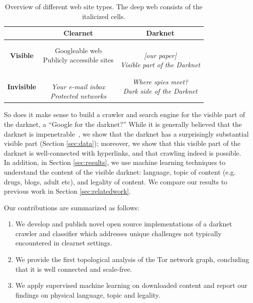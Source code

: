 
\begin{table}[h!]
  \begin{center}
    \caption{Overview of different web site types. The deep web consists of the italicized cells.}
    \label{tab:overview}
    \begin{tabular}{c|c | c }
      & \textbf{Clearnet} & \textbf{Darknet}\\
      \hline
      \hline
      \textbf{Visible}&
      \shortstack[c]{Googleable web \\ Publicly accessible sites} & 
      \shortstack[c]{\\[1pt] \textit{[our paper]} \\ \textit{Visible part of the Darknet}}\\
      \hline
      \textbf{Invisible}&
      \shortstack[c]{\\[1pt] \textit{Your e-mail inbox} \\ \textit{Protected networks}} & 
      \shortstack[c]{\textit{Where spies meet?} \\ \textit{Dark side of the Darknet}}\\
    \end{tabular}
  \end{center}
\end{table}

% 
So does it make sense to build a crawler and search engine for the visible part of the darknet, a ``Google for the darknet?'' While it is generally believed that the darknet is impenetrable~\cite{Biryukov2014,Nabki2017}, we show that the darknet has a surprisingly substantial visible part (Section \ref{sec:data}); moreover, we show that this visible part of the darknet is well-connected with hyperlinks, and that crawling indeed is possible. In addition, in Section \ref{sec:results}, we use machine learning techniques to understand the content of the visible darknet: language, topic of content (e.g. drugs, blogs, adult etc), and legality of content.  
We compare our results to previous work in Section \ref{sec:relatedwork}.

Our contributions are summarized as follows:

\begin{enumerate}
    \item We develop and publish novel open source implementations of a darknet crawler and classifier which addresses unique challenges not typically encountered in clearnet settings.
    \item We provide the first topological analysis of the Tor network graph, concluding that it is well connected and scale-free.
    \item We apply supervised machine learning on downloaded content and report our findings on physical language, topic and legality.
\end{enumerate}

